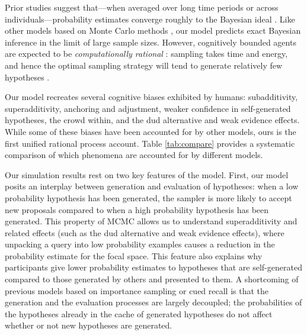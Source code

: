 Prior studies suggest that---when averaged over long time periods or across individuals---probability estimates converge roughly to the Bayesian ideal \citep{Vul2014}. Like other models based on Monte Carlo methods \citep[e.g.,][]{multistability,Lieder2013,shi10}, our model predicts exact Bayesian inference in the limit of large sample sizes. However, cognitively bounded agents are expected to be \emph{computationally rational} \citep{Gershman2015}: sampling takes time and energy, and hence the optimal sampling strategy will tend to generate relatively few hypotheses \citep{Vul2014}. %

Our model recreates several cognitive biases exhibited by humans: subadditivity, superadditivity, anchoring and adjustment, weaker confidence in self-generated hypotheses, the crowd within, and the dud alternative and weak evidence effects. While some of these biases have been accounted for by other models, ours is the first unified rational process account. Table \ref{tab:compare} provides a systematic comparison of which phenomena are accounted for by different models.

Our simulation results rest on two key features of the model. First, our model posits an interplay between generation and evaluation of hypotheses: when a low probability hypothesis has been generated, the sampler is more likely to accept new proposals compared to when a high probability hypothesis has been generated. This property of MCMC allows us to understand superadditivity and related effects (such as the dud alternative and weak evidence effects), where unpacking a query into low probability examples causes a reduction in the probability estimate for the focal space. This feature also explains why participants give lower probability estimates to hypotheses that are self-generated compared to those generated by others and presented to them. A shortcoming of previous models based on importance sampling \citep{shi10} or cued recall \citep{Thomas2008} is that the generation and the evaluation processes are largely decoupled; the probabilities of the hypotheses already in the cache of generated hypotheses do not affect whether or not new hypotheses are generated.


